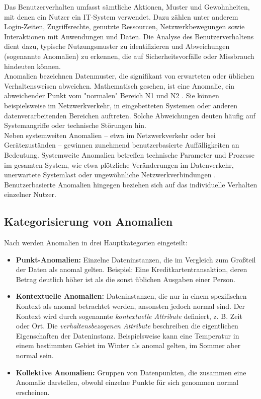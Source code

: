 \documentclass[a4paper,12pt]{article}
\begin{document}
	Das Benutzerverhalten umfasst sämtliche Aktionen, Muster und Gewohnheiten, mit denen ein Nutzer ein IT-System verwendet. Dazu zählen unter anderem Login-Zeiten, Zugriffsrechte, genutzte Ressourcen, Netzwerkbewegungen sowie Interaktionen mit Anwendungen und Daten. Die Analyse des Benutzerverhaltens dient dazu, typische Nutzungsmuster zu identifizieren und Abweichungen (sogenannte Anomalien) zu erkennen, die auf Sicherheitsvorfälle oder Missbrauch hindeuten können.
	\\[0.5em]
	Anomalien bezeichnen Datenmuster, die signifikant von erwarteten oder üblichen Verhaltensweisen abweichen. Mathematisch gesehen, ist eine Anomalie, ein abweichender Punkt vom "normalen" Bereich N1 und N2 \cite{chandola2009anomaly}. Sie können beispielsweise im Netzwerkverkehr, in eingebetteten Systemen oder anderen datenverarbeitenden Bereichen auftreten. Solche Abweichungen deuten häufig auf Systemangriffe oder technische Störungen hin.
	\\[0.5em]
	Neben systemweiten Anomalien – etwa im Netzwerkverkehr oder bei Gerätezuständen – gewinnen zunehmend benutzerbasierte Auffälligkeiten an Bedeutung.
	Systemweite Anomalien betreffen technische Parameter und Prozesse im gesamten System, wie etwa plötzliche Veränderungen im Datenverkehr, unerwartete Systemlast oder ungewöhnliche Netzwerkverbindungen \cite{chandola2009anomaly}.
	Benutzerbasierte Anomalien hingegen beziehen sich auf das individuelle Verhalten einzelner Nutzer.
	
	\subsection{Kategorisierung von Anomalien}
	Nach \cite{chandola2009anomaly} werden Anomalien in drei Hauptkategorien eingeteilt:
	
	\begin{itemize}
		\item \textbf{Punkt-Anomalien:} Einzelne Dateninstanzen, die im Vergleich zum Großteil der Daten als anomal gelten. Beispiel: Eine Kreditkartentransaktion, deren Betrag deutlich höher ist als die sonst üblichen Ausgaben einer Person.
		\item \textbf{Kontextuelle Anomalien:} Dateninstanzen, die nur in einem spezifischen Kontext als anomal betrachtet werden, ansonsten jedoch normal sind. Der Kontext wird durch sogenannte \emph{kontextuelle Attribute} definiert, z. B. Zeit oder Ort. Die \emph{verhaltensbezogenen Attribute} beschreiben die eigentlichen Eigenschaften der Dateninstanz. Beispielsweise kann eine Temperatur in einem bestimmten Gebiet im Winter als anomal gelten, im Sommer aber normal sein.
		\item \textbf{Kollektive Anomalien:} Gruppen von Datenpunkten, die zusammen eine Anomalie darstellen, obwohl einzelne Punkte für sich genommen normal erscheinen.
	\end{itemize}
\end{document}
